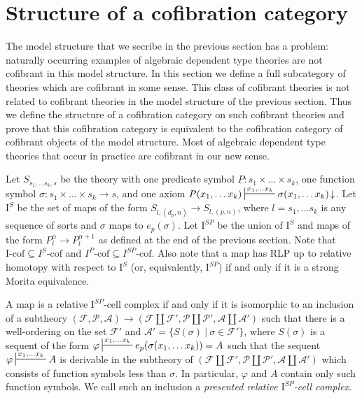 \documentclass[reqno]{amsart}
\theoremstyle{definition}
\theoremstyle{remark}
\newcommand{\I}{\mathrm{I}}
\newcommand{\class}[2]{#1\text{-}\mathrm{#2}}
\newcommand{\Icof}[1][\I]{\class{#1}{cof}}
\numberwithin{figure}{section}
\begin{document}

\section{Structure of a cofibration category}

The model structure that we secribe in the previous section has a problem:
naturally occurring examples of algebraic dependent type theories are not cofibrant in this model structure.
In this section we define a full subcategory of theories which are cofibrant in some sense.
This class of cofibrant theories is not related to cofibrant theories in the model structure of the previous section.
Thus we define the structure of a cofibration category on such cofibrant theories and
prove that this cofibration category is equivalent to the cofibration category of cofibrant objects of the model structure.
Most of algebraic dependent type theories that occur in practice are cofibrant in our new sense.

Let $S_{s_1, \ldots s_k, s}$ be the theory with one predicate symbol $P : s_1 \times \ldots \times s_k$, one function symbol $\sigma : s_1 \times \ldots \times s_k \to s$,
and one axiom $P(x_1, \ldots x_k) \sststile{}{x_1, \ldots x_k} \sigma(x_1, \ldots x_k)\!\downarrow$.
Let $\I^S$ be the set of maps of the form $S_{l,(d_p,n)} \to S_{l,(p,n)}$, where $l = s_1, \ldots s_k$ is any sequence of sorts and $\sigma$ maps to $e_p(\sigma)$.
Let $\I^{SP}$ be the union of $\I^S$ and maps of the form $P^\alpha_l \to P^{\alpha+1}_l$ as defined at the end of the previous section.
Note that $\Icof \subseteq \Icof[I^S]$ and $\Icof[I^P] \subseteq \Icof[I^{SP}]$.
Also note that a map has RLP up to relative homotopy with respect to $\I^S$ (or, equivalently, $\I^{SP}$) if and only if it is a strong Morita equivalence.

A map is a relative $\I^{SP}$-cell complex if and only if it is isomorphic to an inclusion of a subtheory $(\mathcal{F},\mathcal{P},\mathcal{A}) \to (\mathcal{F} \amalg \mathcal{F}', \mathcal{P} \amalg \mathcal{P}', \mathcal{A} \amalg \mathcal{A}')$
such that there is a well-ordering on the set $\mathcal{F}'$ and $\mathcal{A}' = \{ S(\sigma)\ |\ \sigma \in \mathcal{F}' \}$,
where $S(\sigma)$ is a sequent of the form $\varphi \sststile{}{x_1, \ldots x_k} e_p(\sigma(x_1, \ldots x_k)) = A$
such that the sequent $\varphi \sststile{}{x_1, \ldots x_k} A$ is derivable in the subtheory of $(\mathcal{F} \amalg \mathcal{F}', \mathcal{P} \amalg \mathcal{P}', \mathcal{A} \amalg \mathcal{A}')$ which consists of function symbols less than $\sigma$.
In particular, $\varphi$ and $A$ contain only such function symbols.
We call such an inclusion a \emph{presented relative $\I^{SP}$-cell complex}.
\end{document}
